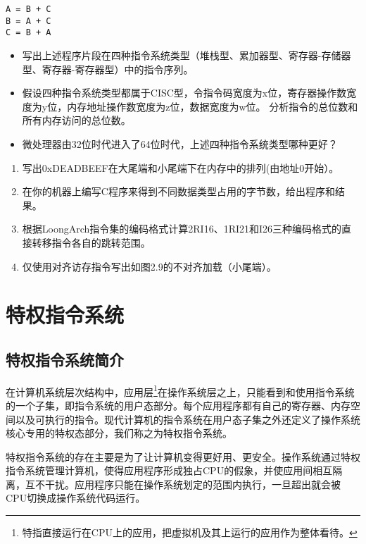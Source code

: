 \documentclass[]{ctexbook}
\providecommand{\tightlist}{%
  \setlength{\itemsep}{0pt}\setlength{\parskip}{0pt}}
\begin{document}
\begin{verbatim}
A = B + C
B = A + C
C = B + A
\end{verbatim}

\begin{itemize}
\tightlist
\item
  写出上述程序片段在四种指令系统类型（堆栈型、累加器型、寄存器-存储器型、寄存器-寄存器型）中的指令序列。
\item
  假设四种指令系统类型都属于CISC型，令指令码宽度为x位，寄存器操作数宽度为y位，内存地址操作数宽度为z位，数据宽度为w位。 分析指令的总位数和所有内存访问的总位数。
\item
  微处理器由32位时代进入了64位时代，上述四种指令系统类型哪种更好？
\end{itemize}

\begin{enumerate}
\def\labelenumi{\arabic{enumi}.}
\setcounter{enumi}{4}
\item
  写出0xDEADBEEF在大尾端和小尾端下在内存中的排列(由地址0开始）。
\item
  在你的机器上编写C程序来得到不同数据类型占用的字节数，给出程序和结果。
\item
  根据LoongArch指令集的编码格式计算2RI16、1RI21和I26三种编码格式的直接转移指令各自的跳转范围。
\item
  仅使用对齐访存指令写出如图2.9的不对齐加载（小尾端）。
\end{enumerate}

\newpage

\hypertarget{sec-privileged-ISA}{%
\chapter{特权指令系统}\label{sec-privileged-ISA}}

\hypertarget{ux7279ux6743ux6307ux4ee4ux7cfbux7edfux7b80ux4ecb}{%
\section{特权指令系统简介}\label{ux7279ux6743ux6307ux4ee4ux7cfbux7edfux7b80ux4ecb}}

在计算机系统层次结构中，应用层\footnote{特指直接运行在CPU上的应用，把虚拟机及其上运行的应用作为整体看待。}在操作系统层之上，只能看到和使用指令系统的一个子集，即指令系统的用户态部分。每个应用程序都有自己的寄存器、内存空间以及可执行的指令。现代计算机的指令系统在用户态子集之外还定义了操作系统核心专用的特权态部分，我们称之为特权指令系统。

特权指令系统的存在主要是为了让计算机变得更好用、更安全。操作系统通过特权指令系统管理计算机，使得应用程序形成独占CPU的假象，并使应用间相互隔离，互不干扰。应用程序只能在操作系统划定的范围内执行，一旦超出就会被CPU切换成操作系统代码运行。
\end{document}
